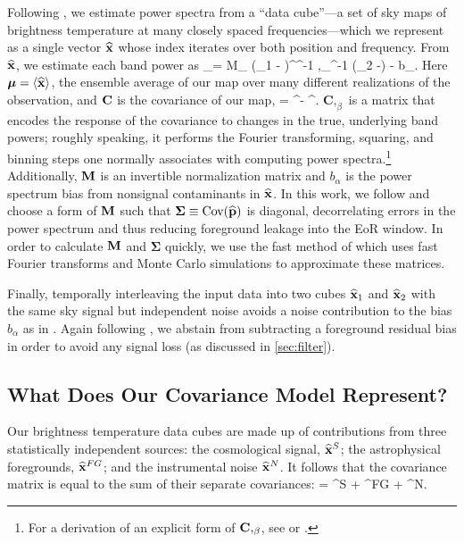 Following \citet{LT11,DillonFast,X13}, we estimate power spectra from a ``data cube''---a set of sky maps of brightness temperature at many closely spaced frequencies---which we represent as a single vector $\widehat{\mathbf{x}}$ whose index iterates over both position and frequency. From $\widehat{\mathbf{x}}$, we estimate each band power as
\beq
{}_\alpha = M_{\alpha\beta} \left(\xhat_1 - \mean\right)^\trans \CC^{-1} ,_\beta \CC^{-1} \left(\xhat_2 -\mean\right) - b_\alpha. \label{eq:QuadEst}
\eeq
Here $\boldsymbol\mu = \langle \widehat{\mathbf{x}} \rangle$, the ensemble average of our map over many different realizations of the observation, and $\mathbf{C}$ is the covariance of our map,
\beq
\CC = \langle \xhat \xhat^\trans \rangle - \langle \xhat \rangle  \langle \xhat \rangle^\trans.
\eeq 
$\mathbf{C},_\beta$ is a matrix that encodes the response of the covariance to changes in the true, underlying band powers; roughly speaking, it performs the Fourier transforming, squaring, and binning steps one normally associates with computing power spectra.\footnote{For a derivation of an explicit form of $\mathbf{C},_\beta$, see \citet{LT11} or \citet{DillonFast}.}  Additionally, $\mathbf{M}$ is an invertible normalization matrix and $b_\alpha$ is the power spectrum bias from nonsignal contaminants in $\widehat{\mathbf{x}}$. In this work, we follow \citet{X13} and choose a form of $\mathbf{M}$ such that $\boldsymbol\Sigma \equiv \text{Cov}(\widehat{\mathbf{p}})$ is diagonal, decorrelating errors in the power spectrum and thus reducing foreground leakage into the EoR window. In order to calculate $\mathbf{M}$ and $\boldsymbol\Sigma$ quickly, we use the fast method of \citet{DillonFast} which uses fast Fourier transforms and Monte Carlo simulations to approximate these matrices.

Finally, temporally interleaving the input data into two cubes $\widehat{\mathbf{x}}_1$ and $\widehat{\mathbf{x}}_2$ with the same sky signal but independent noise avoids a noise contribution to the bias $b_\alpha$ as in \citet{X13}. Again following \citet{X13}, we abstain from subtracting a foreground residual bias in order to avoid any signal loss (as discussed in \ref{sec:filter}).


\subsection{What Does Our Covariance Model Represent?} \label{sec:CovTheory}

Our brightness temperature data cubes are made up of contributions from three statistically independent sources: the cosmological signal, $\widehat{\mathbf{x}}^S$; the astrophysical foregrounds, $\widehat{\mathbf{x}}^{FG}$; and the instrumental noise $\widehat{\mathbf{x}}^N$. It follows that the covariance matrix is equal to the sum of their separate covariances:
\beq
\CC = \CC^S + \CC^{FG} + \CC^N.
\eeq

